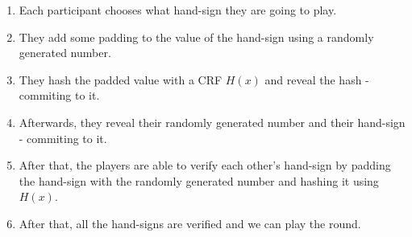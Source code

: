 \documentclass{article}
\begin{document}
\begin{enumerate}
\def\labelenumi{\arabic{enumi}.}
\itemsep1pt\parskip0pt
\item
  Each participant chooses what hand-sign they are going to play.
\item
  They add some padding to the value of the hand-sign using a randomly
  generated number.
\item
  They hash the padded value with a CRF $H(x)$ and reveal the hash -
  commiting to it.
\item
  Afterwards, they reveal their randomly generated number and their
  hand-sign - commiting to it.
\item
  After that, the players are able to verify each other's hand-sign by
  padding the hand-sign with the randomly generated number and hashing
  it using $H(x)$.
\item
  After that, all the hand-signs are verified and we can play the round.
\end{enumerate}


    
    
    
    
\end{document}
